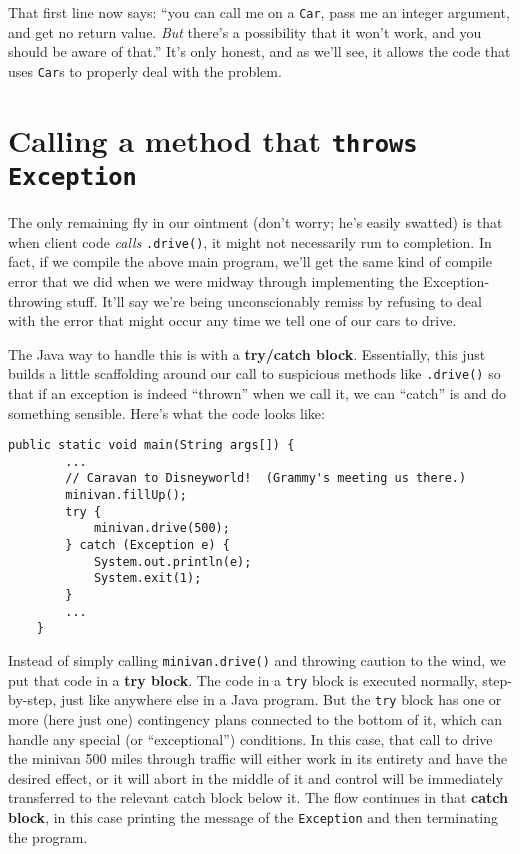 That first line now says: ``you can call me on a \texttt{Car}, pass me an
integer argument, and get no return value. \textit{But} there's a possibility
that it won't work, and you should be aware of that.'' It's only honest, and
as we'll see, it allows the code that uses \texttt{Car}s to properly deal with
the problem.


\section{Calling a method that \texttt{throws} \texttt{Exception}}

The only remaining fly in our ointment (don't worry; he's easily swatted) is
that when client code \textit{calls} \texttt{.drive()}, it might not
necessarily run to completion. In fact, if we compile the above main program,
we'll get the same kind of compile error that we did when we were midway
through implementing the Exception-throwing stuff. It'll say we're being
unconscionably remiss by refusing to deal with the error that might occur
any time we tell one of our cars to drive.

The Java way to handle this is with a \textbf{try/catch block}. Essentially,
this just builds a little scaffolding around our call to suspicious methods
like \texttt{.drive()} so that if an exception is indeed ``thrown'' when we
call it, we can ``catch'' is and do something sensible. Here's what the code
looks like:

\begin{Verbatim}[samepage=true,fontsize=\footnotesize,frame=single]
    public static void main(String args[]) {
        ...
        // Caravan to Disneyworld!  (Grammy's meeting us there.)
        minivan.fillUp();
        try {
            minivan.drive(500);
        } catch (Exception e) {
            System.out.println(e);
            System.exit(1);
        }
        ...
    }
\end{Verbatim}

Instead of simply calling \texttt{minivan.drive()} and throwing caution to the
wind, we put that code in a \textbf{try block}. The code in a \texttt{try}
block is executed normally, step-by-step, just like anywhere else in a Java
program. But the \texttt{try} block has one or more (here just one)
contingency plans connected to the bottom of it, which can handle any special
(or ``exceptional'') conditions. In this case, that call to drive the minivan
500 miles through traffic will either work in its entirety and have the
desired effect, or it will abort in the middle of it and control will be
immediately transferred to the relevant catch block below it. The flow
continues in that \textbf{catch block}, in this case printing the message of
the \texttt{Exception} and then terminating the program.

